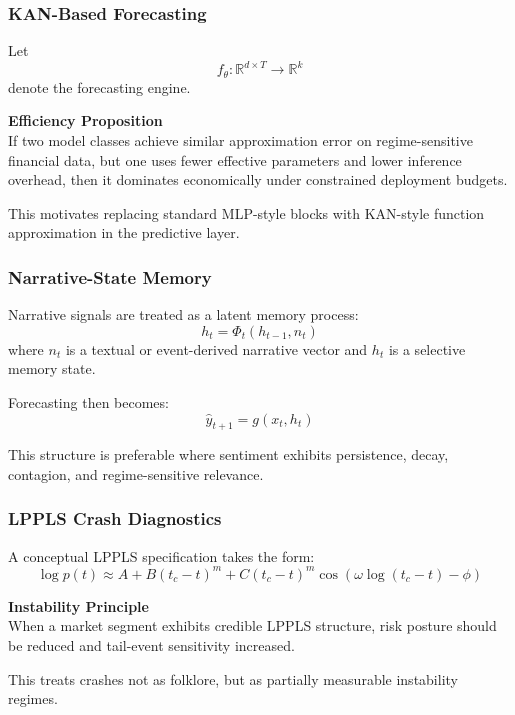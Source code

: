 \documentclass[11pt]{article}
\begin{document}
\subsubsection*{KAN-Based Forecasting}

Let
\[
f_\theta : \mathbb{R}^{d \times T} \to \mathbb{R}^k
\]
denote the forecasting engine.

\begin{theorembox}
\textbf{Efficiency Proposition}\\
If two model classes achieve similar approximation error on regime-sensitive financial data, but one uses fewer effective parameters and lower inference overhead, then it dominates economically under constrained deployment budgets.
\end{theorembox}

This motivates replacing standard MLP-style blocks with KAN-style function approximation in the predictive layer.

\subsubsection*{Narrative-State Memory}

Narrative signals are treated as a latent memory process:
\[
h_t = \Phi_t(h_{t-1}, n_t)
\]
where \(n_t\) is a textual or event-derived narrative vector and \(h_t\) is a selective memory state.

Forecasting then becomes:
\[
\hat{y}_{t+1} = g(x_t, h_t)
\]

This structure is preferable where sentiment exhibits persistence, decay, contagion, and regime-sensitive relevance.

\subsubsection*{LPPLS Crash Diagnostics}

A conceptual LPPLS specification takes the form:
\[
\log p(t) \approx A + B(t_c - t)^m + C(t_c - t)^m \cos(\omega \log(t_c - t) - \phi)
\]

\begin{theorembox}
\textbf{Instability Principle}\\
When a market segment exhibits credible LPPLS structure, risk posture should be reduced and tail-event sensitivity increased.
\end{theorembox}

This treats crashes not as folklore, but as partially measurable instability regimes.
\end{document}
